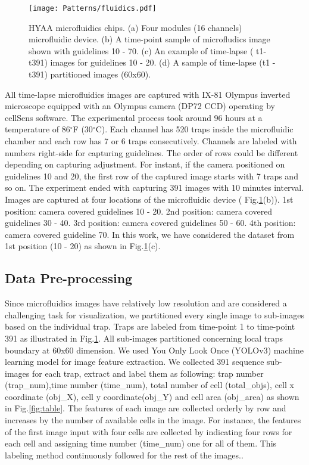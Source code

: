 \documentclass[conference]{IEEEtran}
\begin{document}
\begin{figure}
\centering
\texttt{[image: Patterns/fluidics.pdf]}
\caption{ HYAA microfluidics chips. (a) Four modules (16 channels) microfluidic device. (b) A time-point sample of microfludics image shown with guidelines 10 - 70. (c) An example of time-lapse ( t1-t391) images for guidelines 10 - 20. (d) A sample of time-lapse (t1 - t391) partitioned images (60x60).}
\label{fig:micro}
\end{figure}

All time-lapse microfluidics images are captured with IX-81 Olympus inverted microscope equipped with an Olympus camera (DP72 CCD) operating by cellSens software. The experimental process took around 96 hours at a temperature of 86$^{\circ}$F (30$^{\circ}$C). Each channel has 520 traps inside the microfluidic chamber and each row has 7 or 6 traps consecutively. Channels are labeled with numbers right-side for capturing guidelines. The order of rows could be different depending on capturing adjustment. For instant, if the camera positioned on guidelines 10 and 20, the first row of the captured image starts with 7 traps and so on. The experiment ended with capturing 391 images with 10 minutes interval. Images are captured at four locations of the microfluidic device ( Fig.\ref{fig:micro}(b)). 1st position: camera covered guidelines 10 - 20. 2nd position: camera covered guidelines 30 - 40. 3rd position: camera covered guidelines 50 - 60. 4th position: camera covered guideline 70. In this work, we have considered the dataset from 1st position (10 - 20) as shown in Fig.\ref{fig:micro}(c).

\subsection{Data Pre-processing}

Since microfluidics images have relatively low resolution and are considered a challenging task for visualization, we partitioned every single image to sub-images based on the individual trap. Traps are labeled from time-point 1 to time-point 391 as illustrated in Fig.\ref{fig:micro}. All sub-images partitioned concerning local traps boundary at 60x60 dimension. We used You Only Look Once (YOLOv3) \cite{ref20} machine learning model for image feature extraction. We collected 391 sequence sub-images for each trap, extract and label them as following: trap number (trap\_num),time number (time\_num), total number of cell (total\_objs), cell x coordinate (obj\_X), cell y coordinate(obj\_Y) and cell area (obj\_area) as shown in Fig.\ref{fig:table}. The features of each image are collected orderly by row and increases by the number of available cells in the image. For instance, the features of the first image input with four cells are collected by indicating four rows for each cell and assigning time number (time\_num) one for all of them. This labeling method continuously followed for the rest of the images..
\end{document}
